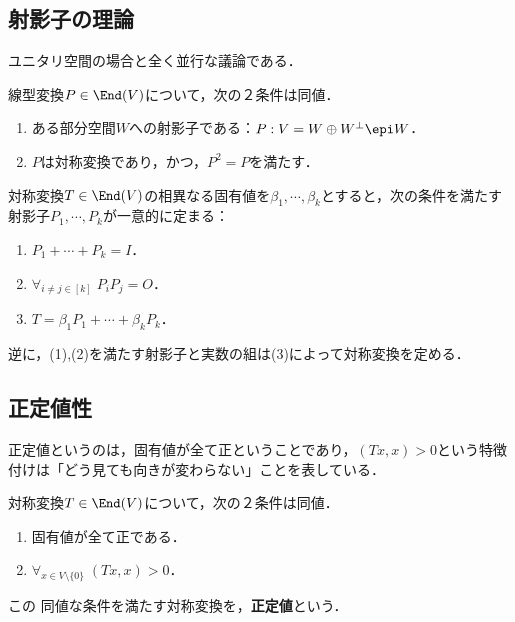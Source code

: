 \documentclass[uplatex, dvipdfmx]{jsreport}
\begin{document}
\subsection{射影子の理論}

\begin{tcolorbox}[colframe=ForestGreen, colback=ForestGreen!10!white,breakable,colbacktitle=ForestGreen!40!white,coltitle=black,fonttitle=\bfseries\sffamily,
title=]
    ユニタリ空間の場合と全く並行な議論である．
\end{tcolorbox}

\begin{proposition}[射影子の特徴付け]
    線型変換$P\in\End(V)$について，次の２条件は同値．
    \begin{enumerate}
        \item ある部分空間$W$への射影子である：$P:V=W\oplus W^\perp\epi W$．
        \item $P$は対称変換であり，かつ，$P^2=P$を満たす．
    \end{enumerate}
\end{proposition}

\begin{theorem}[スペクトル分解]
    対称変換$T\in\End(V)$の相異なる固有値を$\beta_1,\cdots,\beta_k$とすると，次の条件を満たす射影子$P_1,\cdots,P_k$が一意的に定まる：
    \begin{enumerate}
        \item $P_1+\cdots+P_k=I$．
        \item $\forall_{i\ne j\in[k]}\;P_iP_j=O$．
        \item $T=\beta_1P_1+\cdots+\beta_kP_k$．
    \end{enumerate}
    逆に，(1),(2)を満たす射影子と実数の組は(3)によって対称変換を定める．
\end{theorem}

\subsection{正定値性}

\begin{tcolorbox}[colframe=ForestGreen, colback=ForestGreen!10!white,breakable,colbacktitle=ForestGreen!40!white,coltitle=black,fonttitle=\bfseries\sffamily,
title=]
    正定値というのは，固有値が全て正ということであり，$(Tx,x)> 0$という特徴付けは「どう見ても向きが変わらない」ことを表している．
\end{tcolorbox}

\begin{proposition}
    対称変換$T\in\End(V)$について，次の２条件は同値．
    \begin{enumerate}
        \item 固有値が全て正である．
        \item $\forall_{x\in V\setminus\{0\}}\;(Tx,x)>0$．
    \end{enumerate}この
    同値な条件を満たす対称変換を，\textbf{正定値}という．
\end{proposition}
\end{document}
